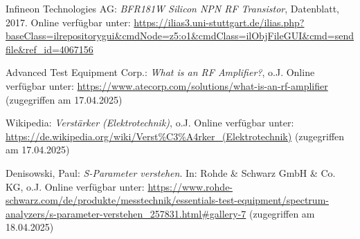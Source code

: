 \begin{thebibliography}{1}
Infineon Technologies AG: \emph{BFR181W Silicon NPN RF Transistor}, Datenblatt, 2017. Online verfügbar unter: \url{https://ilias3.uni-stuttgart.de/ilias.php?baseClass=ilrepositorygui&cmdNode=z5:o1&cmdClass=ilObjFileGUI&cmd=sendfile&ref_id=4067156}

Advanced Test Equipment Corp.: \emph{What is an RF Amplifier?}, o.J. Online verfügbar unter: \url{https://www.atecorp.com/solutions/what-is-an-rf-amplifier} (zugegriffen am 17.04.2025)

Wikipedia: \emph{Verstärker (Elektrotechnik)}, o.J. Online verfügbar unter: \url{https://de.wikipedia.org/wiki/Verst%C3%A4rker_(Elektrotechnik)} (zugegriffen am 17.04.2025)

Denisowski, Paul: \emph{S-Parameter verstehen}. In: Rohde \& Schwarz GmbH \& Co. KG, o.J. Online verfügbar unter: \url{https://www.rohde-schwarz.com/de/produkte/messtechnik/essentials-test-equipment/spectrum-analyzers/s-parameter-verstehen\_257831.html\#gallery-7} (zugegriffen am 18.04.2025)
\end{thebibliography}
%
\clearpage